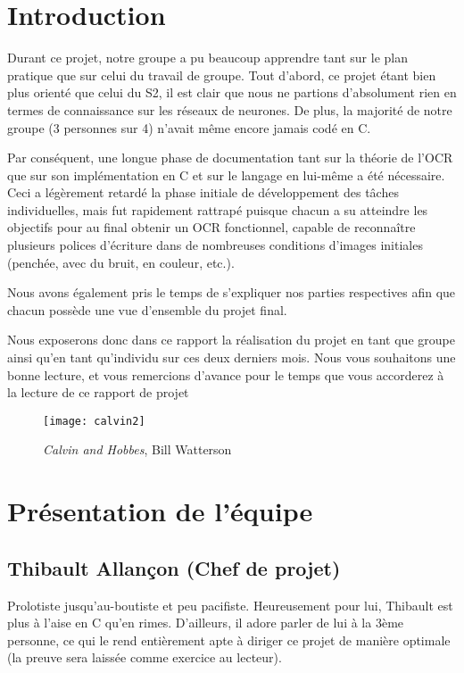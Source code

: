\chapter{Introduction}

Durant ce projet, notre groupe a pu beaucoup apprendre tant sur le plan pratique
que sur celui du travail de groupe. Tout d'abord, ce projet étant bien plus
orienté que celui du S2, il est clair que nous ne partions d'absolument rien en
termes de connaissance sur les réseaux de neurones. De plus, la majorité de
notre groupe (3 personnes sur 4) n'avait même encore jamais codé en C.

Par conséquent, une longue phase de documentation tant sur la théorie de l'OCR
que sur son implémentation en C et sur le langage en lui-même a été nécessaire.
Ceci a légèrement retardé la phase initiale de développement des tâches
individuelles, mais fut rapidement rattrapé puisque chacun a su atteindre les
objectifs pour au final obtenir un OCR fonctionnel, capable de reconnaître
plusieurs polices d'écriture dans de nombreuses conditions d'images initiales
(penchée, avec du bruit, en couleur, etc.).

Nous avons également pris le temps de s'expliquer nos parties respectives afin
que chacun possède une vue d'ensemble du projet final.

Nous exposerons donc dans ce rapport la réalisation du projet en tant que groupe
ainsi qu'en tant qu'individu sur ces deux derniers mois. Nous vous souhaitons
une bonne lecture, et vous remercions d'avance pour le temps que vous accorderez
à la lecture de ce rapport de projet

\begin{figure}
    \centering
    \texttt{[image: calvin2]}
    \caption*{\textit{Calvin and Hobbes}, Bill Watterson}
\end{figure}

\chapter{Présentation de l'équipe}

\section{Thibault Allançon (Chef de projet)}

Prolotiste jusqu’au-boutiste et peu pacifiste. Heureusement pour lui, Thibault
est plus à l'aise en C qu'en rimes. D'ailleurs, il adore parler de lui à la 3ème
personne, ce qui le rend entièrement apte à diriger ce projet de manière
optimale (la preuve sera laissée comme exercice au lecteur).

